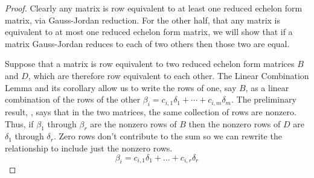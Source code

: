 \begin{proof}
Clearly any matrix is row equivalent to at least 
one reduced echelon form matrix, via Gauss-Jordan reduction.
For the other half, that any matrix is equivalent to at most one 
reduced echelon form matrix, we will show that
if a matrix Gauss-Jordan reduces to each of two others then those
two are equal.

Suppose that a matrix is row equivalent to two reduced echelon form matrices
\( B \) and \( D \), which are therefore row equivalent to each other.
The Linear Combination Lemma and its corollary allow us to
write the rows of one, say \( B \), as a linear combination 
of the rows of the other
$\beta_i=c_{i,1}\delta_1+\cdots+c_{i,m}\delta_m$.
The preliminary result, , says that
in the two matrices, the same collection of rows are nonzero.
Thus, if $\beta_1$ through $\beta_r$ are the nonzero rows of $B$ then 
the nonzero rows of $D$ are $\delta_1$ through $\delta_r$.
Zero rows don't contribute to the sum so we can rewrite the relationship
to include just the nonzero rows.
\begin{equation*}
   \beta_i =c_{i,1}\delta_1+\dots+c_{i,r}\delta_r        
\tag*{($*$)}\end{equation*}


\end{proof}
